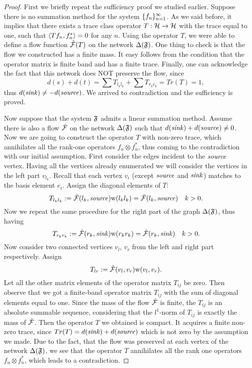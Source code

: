 \documentclass[12pt]{article}
\begin{document}
    \begin{proof}
      First we briefly repeat the sufficiency proof we studied earlier.
      Suppose there is no summation method for the system $\seq{f}$.
      As we said before, it implies that there exists a trace class operator $T : \cal{H} \to \cal{H}$ with
      the trace equal to one, such that $\inner{Tf_n}{f_n^*} = 0$ for any $n$.
      Using the operator $T$, we were able to define a flow function $\flow(T)$ on the network
      $\net(\fsys)$.
      One thing to check is that the flow we constructed has a finite mass.
      It easy follows from the condition that the operator matrix is finite band and has a finite trace.
      Finally, one can acknowledge the fact that this network does NOT preserve the flow, since
      $$
        d(s) + d(t) = \sum T_{l_k l_k} + \sum T_{r_k r_k} = Tr(T) = 1,
      $$
      thus $d(\sink) \neq -d(\source)$.
      We arrived to contradiction and the sufficiency is proved.

      Now suppose that the system $\fsys$ admits a linear summation method.
      Assume there is also a flow $\flow$ on the network $\net(\fsys)$ such that $d(\sink) + d(\source) \neq 0$.
      Now we are going to construct the operator $T$ with non-zero trace, which annihilates all the rank-one
      operators $f_n \otimes f^*_n$, thus coming to the contradiction with our initial assumption.
      First consider the edges incident to the $\source$ vertex.
      Having all the vertices already enumerated we will consider the vertices in the left part $v_{l_k}$.
      Recall that each vertex $v_i$ (except $\source$ and $\sink$) matches to the basis element $e_i$.
      Assign the diagonal elements of $T$:
      $$
        T_{l_k l_k} := \flow(l_k, \source) \wtp(l_k l_k) = \flow(l_k, \source) \quad k > 0.
      $$
      Now we repeat the same procedure for the right part of the graph $\net(\fsys)$, thus having
      $$
        T_{r_k r_k} := \flow(r_k, \sink) \wtp(r_k r_k) = \flow(r_k, \sink) \quad k > 0.
      $$
      Now consider two connected vertices $v_l$, $v_r$ from the left and right part
      respectively. Assign
      $$
        T_{lr} := \flowsgn(v_l, v_r) \wtp(v_l, v_r).
      $$
      Let all the other matrix elements of the operator matrix $T_{ij}$ be zero.
      Then observe that we got a finite-band operator matrix $T_{ij}$ with the sum of diagonal elements
      equal to one.
      Since the mass of the flow $\flow$ is finite, the $T_{ij}$ is an absolute summable sequence, considering that
        the $l^1$-norm of $T_{ij}$ is exactly the mass of $\flow$.
      Then the operator $T$ we obtained is compact.
      It acquires a finite non-zero trace, since $Tr(T) = d(\sink) + d(\source)$ which is not zero
        by the assumption we made.
      Due to the fact, that the flow was preserved at each vertex of the network $\net(\fsys)$,
        we see that the operator $T$ annihilates all the rank one operators $f_n \otimes f^*_n$,
        which leads to a contradiction.
    \end{proof}
    
\end{document}
